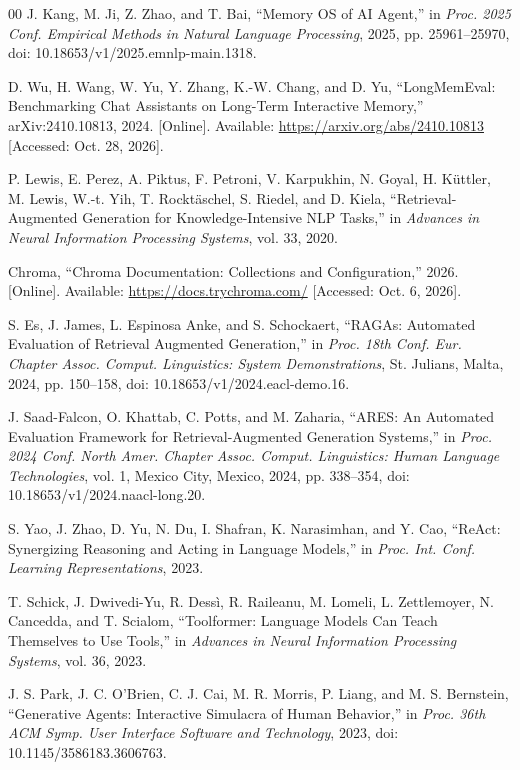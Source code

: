 {\begin{thebibliography}{00}
 J. Kang, M. Ji, Z. Zhao, and T. Bai, ``Memory OS of AI Agent,'' in \emph{Proc. 2025 Conf. Empirical Methods in Natural Language Processing}, 2025, pp. 25961--25970, doi: 10.18653/v1/2025.emnlp-main.1318.

 D. Wu, H. Wang, W. Yu, Y. Zhang, K.-W. Chang, and D. Yu, ``LongMemEval: Benchmarking Chat Assistants on Long-Term Interactive Memory,'' arXiv:2410.10813, 2024. [Online]. Available: \url{https://arxiv.org/abs/2410.10813} [Accessed: Oct. 28, 2026].

 P. Lewis, E. Perez, A. Piktus, F. Petroni, V. Karpukhin, N. Goyal, H. K{\"u}ttler, M. Lewis, W.-t. Yih, T. Rockt{\"a}schel, S. Riedel, and D. Kiela, ``Retrieval-Augmented Generation for Knowledge-Intensive NLP Tasks,'' in \emph{Advances in Neural Information Processing Systems}, vol. 33, 2020.

 Chroma, ``Chroma Documentation: Collections and Configuration,'' 2026. [Online]. Available: \url{https://docs.trychroma.com/} [Accessed: Oct. 6, 2026].

 S. Es, J. James, L. Espinosa Anke, and S. Schockaert, ``RAGAs: Automated Evaluation of Retrieval Augmented Generation,'' in \emph{Proc. 18th Conf. Eur. Chapter Assoc. Comput. Linguistics: System Demonstrations}, St. Julians, Malta, 2024, pp. 150--158, doi: 10.18653/v1/2024.eacl-demo.16.

 J. Saad-Falcon, O. Khattab, C. Potts, and M. Zaharia, ``ARES: An Automated Evaluation Framework for Retrieval-Augmented Generation Systems,'' in \emph{Proc. 2024 Conf. North Amer. Chapter Assoc. Comput. Linguistics: Human Language Technologies}, vol. 1, Mexico City, Mexico, 2024, pp. 338--354, doi: 10.18653/v1/2024.naacl-long.20.

 S. Yao, J. Zhao, D. Yu, N. Du, I. Shafran, K. Narasimhan, and Y. Cao, ``ReAct: Synergizing Reasoning and Acting in Language Models,'' in \emph{Proc. Int. Conf. Learning Representations}, 2023.

 T. Schick, J. Dwivedi-Yu, R. Dess{\`i}, R. Raileanu, M. Lomeli, L. Zettlemoyer, N. Cancedda, and T. Scialom, ``Toolformer: Language Models Can Teach Themselves to Use Tools,'' in \emph{Advances in Neural Information Processing Systems}, vol. 36, 2023.

 J. S. Park, J. C. O'Brien, C. J. Cai, M. R. Morris, P. Liang, and M. S. Bernstein, ``Generative Agents: Interactive Simulacra of Human Behavior,'' in \emph{Proc. 36th ACM Symp. User Interface Software and Technology}, 2023, doi: 10.1145/3586183.3606763.


\end{thebibliography}}
